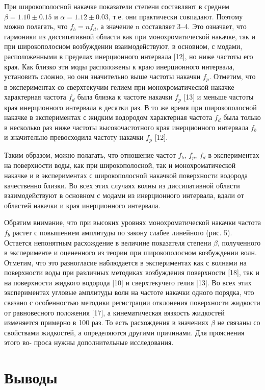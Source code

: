 При широкополосной накачке показатели степени составляют в среднем $\beta = 1.10 \pm 0.15$ и $\alpha = 1.12 \pm 0.03$, т.е. они практически совпадают. Поэтому можно полагать, что $f_b = n f_d$, а значение n составляет 3–4. Это означает, что гармоники из диссипативной области как при монохроматической накачке, так и при широкополосном возбуждении взаимодействуют, в основном, с модами, расположенными в пределах инерционного интервала [12], но ниже частоты его края. Как близко эти моды расположены к краю инерционного интервала, установить сложно, но они значительно выше частоты накачки $f_p$.
Отметим, что в экспериментах со сверхтекучим гелием при монохроматической накачке характерная частота $f_d$ была близка к частоте накачки $f_p$ [13] и меньше частоты края инерционного интервала в десятки раз. В то же время при широкополосной накачке в экспериментах с жидким водородом характерная частота $f_d$ была только в несколько раз ниже частоты высокочастотного края инерционного интервала $f_b$ и значительно превосходила частоту накачки $f_p$ [12].

Таким образом, можно полагать, что отношение частот $f_b$, $f_p$, $f_d$ в экспериментах на поверхности воды, как при широкополосной, так и монохроматической накачке и в экспериментах с широкополосной накачкой поверхности водорода качественно близки. Во всех этих случаях волны из диссипативной области взаимодействуют в основном с модами из инерционного интервала, вдали от областей накачки и края инерционного интервала.

Обратим внимание, что при высоких уровнях монохроматической накачки частота $f_b$ растет с повышением амплитуды по закону слабее линейного (рис. 5). Остается непонятным расхождение в величине показателя степени $\beta$, полученного в эксперименте и оцененного из теории при широкополосном возбуждении волн. Отметим, что это разногласие наблюдается в экспериментах как с волнами на поверхности воды при различных методиках возбуждения поверхности [18], так и на поверхности жидкого водорода [10] и сверхтекучего гелия [13]. Во всех этих экспериментах угловые амплитуды волн на частоте накачки одного порядка, что связано с особенностью методики регистрации отклонения поверхности жидкости от равновесного положения [17], а кинематическая вязкость жидкостей изменяется примерно в 100 раз. То есть расхождения в значениях $\beta$ не связаны со свойствами жидкостей, а определяются другими причинами. Для прояснения этого во- проса нужны дополнительные исследования.

\section{Выводы} \label{sect2_4}

